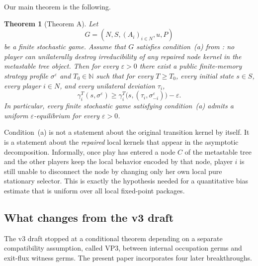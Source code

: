 \documentclass[12pt]{article}
\newtheorem{theorem}{Theorem}[section]
\theoremstyle{definition}
\newcommand{\eps}{\varepsilon}
\newcommand{\N}{\mathbb{N}}
\newcommand{\1}{\mathbf{1}}
\begin{document}
Our main theorem is the following.

\begin{theorem}[Theorem A]
\label{thm:A}
Let
\[
G=(N,S,(A_i)_{i\in N},u,P)
\]
be a finite stochastic game.  Assume that \(G\) satisfies condition~\textnormal{(a)}
from : no player can unilaterally destroy irreducibility of any repaired
node kernel in the metastable tree object.  Then for every $\eps>0$ there exist a public
finite-memory strategy profile $\sigma^\eps$ and $T_0\in\N$ such that for every
$T\ge T_0$, every initial state $s\in S$, every player $i\in N$, and every unilateral
deviation $\tau_i$,
\[
\gamma_i^T(s,\sigma^\eps)\ge
\gamma_i^T\bigl(s,(\tau_i,\sigma^\eps_{-i})\bigr)-\eps.
\]
In particular, every finite stochastic game satisfying condition~\textnormal{(a)} admits
a uniform $\eps$-equilibrium for every $\eps>0$.
\end{theorem}

Condition~(a) is not a statement about the original transition kernel by itself.  It is a
statement about the \emph{repaired} local kernels that appear in the asymptotic
decomposition.  Informally, once play has entered a node $C$ of the metastable tree and
the other players keep the local behavior encoded by that node, player $i$ is still
unable to disconnect the node by changing only her own local pure stationary selector.
This is exactly the hypothesis needed for a quantitative bias estimate that is uniform
over all local fixed-point packages.

\subsection{What changes from the v3 draft}

The v3 draft stopped at a conditional theorem depending on a separate compatibility
assumption, called VP3, between internal occupation germs and exit-flux witness germs.
The present paper incorporates four later breakthroughs.
\end{document}
